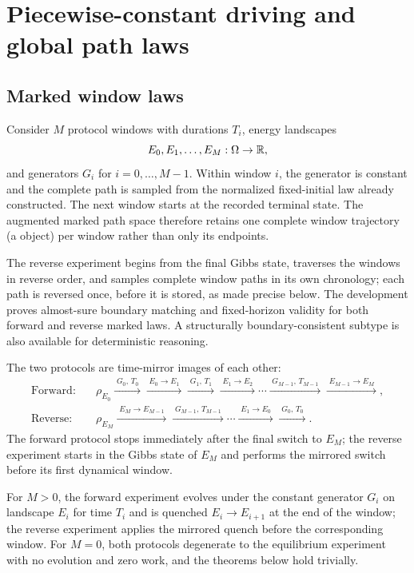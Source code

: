 \section{Piecewise-constant driving and global path laws}
\label{sec:driven}

\subsection{Marked window laws}

Consider $M$ protocol windows with durations $T_i$, energy landscapes
\[
  E_0,E_1,\ldots,E_M:\Omega\to\mathbb{R},
\]
and generators $G_i$ for $i=0,\ldots,M-1$. Within window $i$, the generator is constant and the complete path is sampled from the normalized fixed-initial law already constructed. The next window starts at the recorded terminal state. The augmented marked path space therefore retains one complete window trajectory (a  object) per window rather than only its endpoints.

The reverse experiment begins from the final Gibbs state, traverses the windows in reverse order, and samples complete window paths in its own chronology; each path is reversed once, before it is stored, as made precise below. The development proves almost-sure boundary matching and fixed-horizon validity for both forward and reverse marked laws. A structurally boundary-consistent subtype is also available for deterministic reasoning.

The two protocols are time-mirror images of each other:
\[
\begin{aligned}
\text{Forward:}\quad&
\rho_{E_0}
\xrightarrow{\;G_0,\,T_0\;}
\xrightarrow{\;E_0\to E_1\;}
\xrightarrow{\;G_1,\,T_1\;}
\xrightarrow{\;E_1\to E_2\;}
\cdots
\xrightarrow{\;G_{M-1},\,T_{M-1}\;}
\xrightarrow{\;E_{M-1}\to E_M\;},
\\[1mm]
\text{Reverse:}\quad&
\rho_{E_M}
\xrightarrow{\;E_M\to E_{M-1}\;}
\xrightarrow{\;G_{M-1},\,T_{M-1}\;}
\cdots
\xrightarrow{\;E_1\to E_0\;}
\xrightarrow{\;G_0,\,T_0\;}.
\end{aligned}
\]
The forward protocol stops immediately after the final switch to $E_M$; the reverse experiment starts in the Gibbs state of $E_M$ and performs the mirrored switch before its first dynamical window.

For $M>0$, the forward experiment evolves under the constant generator $G_i$ on landscape $E_i$ for time $T_i$ and is quenched $E_i\to E_{i+1}$ at the end of the window; the reverse experiment applies the mirrored quench before the corresponding window. For $M=0$, both protocols degenerate to the equilibrium experiment with no evolution and zero work, and the theorems below hold trivially.

